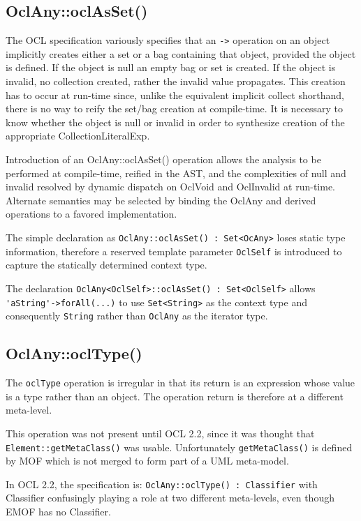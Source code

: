 \documentclass{eceasst}
\begin{document}
\subsection{OclAny::oclAsSet()}

The OCL specification variously specifies that an \verb|->| operation on an object implicitly creates either a set or a bag containing that object, provided the object is defined. If the object is null an empty bag or set is created. If the object is invalid, no collection created, rather the invalid value propagates. This creation has to occur at run-time since, unlike the equivalent implicit collect shorthand, there is no way to reify the set/bag creation at compile-time. It is necessary to know whether the object is null or invalid in order to synthesize creation of the appropriate CollectionLiteralExp.

Introduction of an OclAny::oclAsSet() operation allows the analysis to be performed at compile-time, reified in the AST, and the complexities of null and invalid resolved by dynamic dispatch on OclVoid and OclInvalid at run-time. Alternate semantics may be selected by binding the OclAny and derived operations to a favored implementation.

The simple declaration as \verb!OclAny::oclAsSet() : Set<OcAny>! loses static type information, therefore a reserved template parameter \verb!OclSelf! is introduced to capture the statically determined context type.

The declaration \verb!OclAny<OclSelf>::oclAsSet() : Set<OclSelf>! allows \verb|'aString'->forAll(...)| to use \verb|Set<String>| as the context type and consequently \verb|String| rather than \verb|OclAny| as the iterator type.

\subsection{OclAny::oclType()}

The \verb!oclType! operation is irregular in that its return is an expression whose value is a type rather than an object. The operation return is therefore at a different meta-level.

This operation was not present until OCL 2.2, since it was thought that \verb!Element::getMetaClass()! was usable. Unfortunately \verb!getMetaClass()! is defined by MOF which is not merged to form part of a UML meta-model.

In OCL 2.2, the specification is: \verb!OclAny::oclType() : Classifier! with Classifier confusingly playing a role at two different meta-levels, even though EMOF has no Classifier.
\end{document}
